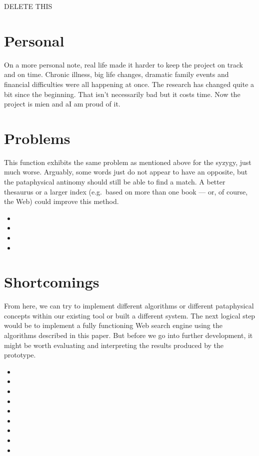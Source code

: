 \begin{draft}
  DELETE THIS


\section{Personal}

On a more personal note, real life made it harder to keep the project on track and on time. Chronic illness, big life changes, dramatic family events and financial difficulties were all happening at once. The research has changed quite a bit since the beginning. That isn't necessarily bad but it costs time. Now the project is mien and aI am proud of it.


\section{Problems}

This function exhibits the same problem as mentioned above for the syzygy, just much worse. Arguably, some words just do not appear to have an opposite, but the pataphysical antinomy should still be able to find a match. A better thesaurus or a larger index (e.g.\ based on more than one book –-- or, of course, the Web) could improve this method.

\begin{itemize}
  \item
  \item
  \item 
  \item
\end{itemize}


\section{Shortcomings}

From here, we can try to implement different algorithms or different pataphysical concepts within our existing tool or built a different system. The next logical step would be to implement a fully functioning Web search engine using the algorithms described in this paper. But before we go into further development, it might be worth evaluating and interpreting the results produced by the prototype.

\begin{itemize}
  \item
  \item
  \item
  \item
  \item
  \item
  \item
  \item
  \item
\end{itemize}







\end{draft}
